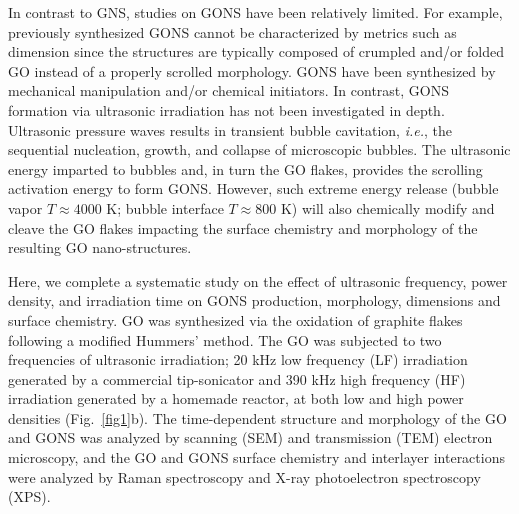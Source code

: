 In contrast to GNS, studies on GONS have been relatively limited. For example, previously synthesized GONS cannot be characterized by metrics such as dimension since the structures are typically composed of crumpled and/or folded GO\cite{Li2013,Fan2015} instead of a properly scrolled morphology. GONS have been synthesized by mechanical manipulation\cite{Li2013,Fan2015} and/or chemical initiators.\cite{Gong2014,Rani2015} In contrast, GONS formation via ultrasonic irradiation has not been investigated in depth. Ultrasonic pressure waves results in transient bubble cavitation, \textit{i.e.}, the sequential nucleation, growth, and collapse of microscopic bubbles.\cite{Patil2007} The ultrasonic energy imparted to bubbles and, in turn the GO flakes, provides the scrolling activation energy to form GONS. However, such extreme energy release (bubble vapor $T \approx4000$ K; bubble interface $T \approx800$ K) will also chemically modify and cleave the GO flakes impacting the surface chemistry and morphology of the resulting GO nano-structures.\cite{Goncalves2014}

Here, we complete a systematic study on the effect of ultrasonic frequency, power density, and irradiation time on GONS production, morphology, dimensions and surface chemistry. GO was synthesized via the oxidation of graphite flakes following a modified Hummers' method.\cite{Hummers1958,Perrozzi2015} The GO was subjected to two frequencies of ultrasonic irradiation; 20 kHz low frequency (LF) irradiation generated by a commercial tip-sonicator and 390 kHz high frequency (HF) irradiation generated by a homemade reactor, at both low and high power densities (Fig.~\ref{fig1}b). The time-dependent structure and morphology of the GO and GONS was analyzed by scanning (SEM) and transmission (TEM) electron microscopy, and the GO and GONS surface chemistry and interlayer interactions were analyzed by Raman spectroscopy and X-ray photoelectron spectroscopy (XPS).

